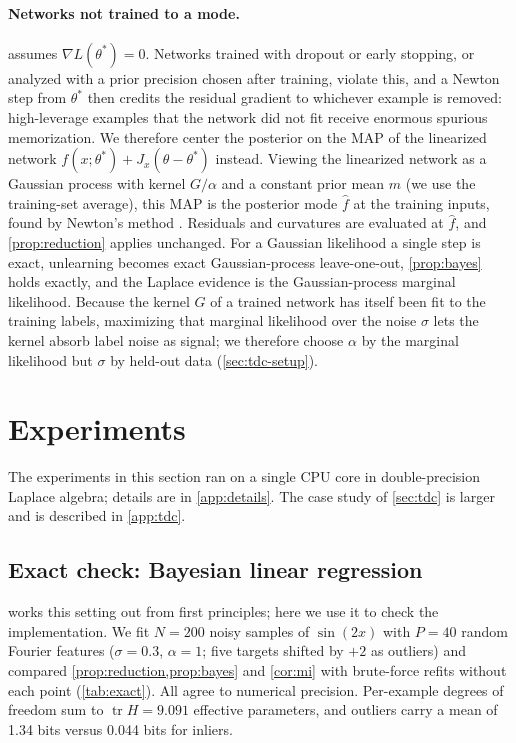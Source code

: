 \documentclass[10pt,twocolumn,letterpaper]{article}
\theoremstyle{definition}
\newcommand{\tr}{\operatorname{tr}}
\begin{document}
\paragraph{Networks not trained to a mode.}  assumes $\nabla L(\theta^*)=0$. Networks trained with dropout or early stopping, or analyzed with a prior precision chosen after training, violate this, and a Newton step from $\theta^*$ then credits the residual gradient to whichever example is removed: high-leverage examples that the network did not fit receive enormous spurious memorization. We therefore center the posterior on the MAP of the linearized network $f(x;\theta^*)+J_x(\theta-\theta^*)$ instead. Viewing the linearized network as a Gaussian process with kernel $G/\alpha$ \citep{khan2019,immer2021} and a constant prior mean $m$ (we use the training-set average), this MAP is the posterior mode $\hat f$ at the training inputs, found by Newton's method \citep[Alg.~3.1]{rasmussen2006}. Residuals and curvatures are evaluated at $\hat f$, and \cref{prop:reduction} applies unchanged. For a Gaussian likelihood a single step is exact, unlearning becomes exact Gaussian-process leave-one-out, \cref{prop:bayes} holds exactly, and the Laplace evidence is the Gaussian-process marginal likelihood. Because the kernel $G$ of a trained network has itself been fit to the training labels, maximizing that marginal likelihood over the noise $\sigma$ lets the kernel absorb label noise as signal; we therefore choose $\alpha$ by the marginal likelihood but $\sigma$ by held-out data (\cref{sec:tdc-setup}).

\section{Experiments}
The experiments in this section ran on a single CPU core in double-precision Laplace algebra; details are in \cref{app:details}. The case study of \cref{sec:tdc} is larger and is described in \cref{app:tdc}.

\subsection{Exact check: Bayesian linear regression}\label{sec:exact}
 works this setting out from first principles; here we use it to check the implementation. We fit $N=200$ noisy samples of $\sin(2x)$ with $P=40$ random Fourier features ($\sigma=0.3$, $\alpha=1$; five targets shifted by $+2$ as outliers) and compared \cref{prop:reduction,prop:bayes} and \cref{cor:mi} with brute-force refits without each point (\cref{tab:exact}). All agree to numerical precision. Per-example degrees of freedom sum to $\tr H=9.091$ effective parameters, and outliers carry a mean of 1.34 bits versus 0.044 bits for inliers.
\end{document}

